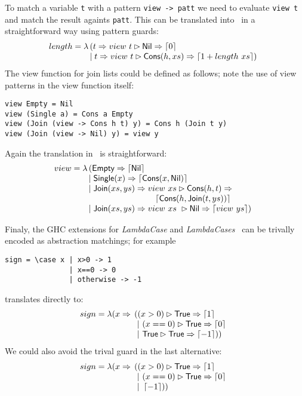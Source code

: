 To match a variable \texttt{t} with a pattern \verb|view -> patt|
we need to evaluate \verb|view t| and match the result againts \verb|patt|.
This can be translated into \lambdaPMC\ in a straightforward way
using pattern guards:
\[
  length = \lambda \!\!\begin{array}[t]{l}
                     (t \Rightarrow view~t \rhd 
      \textsf{Nil} \Rightarrow \left\lceil 0\right\rceil \\
      \mid t \Rightarrow view~t \rhd \textsf{Cons}(h,xs) \Rightarrow \left\lceil 1+length~ xs\right\rceil)
    \end{array} \\
\]
The view function for join lists could be defined as follows; note the use
of view patterns in the view function itself:
\begin{verbatim}
view Empty = Nil
view (Single a) = Cons a Empty
view (Join (view -> Cons h t) y) = Cons h (Join t y)
view (Join (view -> Nil) y) = view y
\end{verbatim}
Again the translation in \lambdaPMC\ is straightforward:
\[
  view = \lambda\!\!
  \begin{array}[t]{l}
    (\textsf{Empty} \Rightarrow \left\lceil \textsf{Nil}\right\rceil \\
    \mid \textsf{Single}(x) \Rightarrow \left\lceil \textsf{Cons}(x,\textsf{Nil})\right\rceil \\
    \mid \textsf{Join}(xs,ys) \Rightarrow view~xs \rhd 
    \textsf{Cons}(h,t) \Rightarrow \\
    \qquad \qquad\qquad\qquad \left\lceil \textsf{Cons}(h,\textsf{Join}(t,ys))\right\rceil \\
    \mid \textsf{Join}(xs,ys) \Rightarrow view~xs ~ \rhd
    \textsf{Nil} \Rightarrow \left\lceil view~ys\right\rceil)
  \end{array}
\]

Finaly, the GHC extensions for \emph{LambdaCase} and
\emph{LambdaCases}~\cite{ghc_guide_lambda_case} can be trivally
encoded as abstraction matchings; for example
\begin{verbatim}
sign = \case x | x>0 -> 1
               | x==0 -> 0
               | otherwise -> -1
\end{verbatim}
translates directly to:
\[ sign = \lambda (x \Rightarrow \!\!\begin{array}[t]{l}
  ((x>0) \rhd  \textsf{True} \Rightarrow \left\lceil 1\right\rceil \\
  ~|~ (x==0)\rhd \textsf{True} \Rightarrow \left\lceil 0\right\rceil\\
  ~|~ \textsf{True} \rhd \textsf{True} \Rightarrow  \left\lceil -1\right\rceil ))
 \end{array}    
\]
%
We could also avoid the trival guard in the last alternative:
%
\[ sign = \lambda (x \Rightarrow \!\!\begin{array}[t]{l}
  ((x>0) \rhd  \textsf{True} \Rightarrow \left\lceil 1\right\rceil \\
  ~|~ (x==0)\rhd \textsf{True} \Rightarrow \left\lceil 0\right\rceil\\
  ~|~  \left\lceil -1\right\rceil ))
 \end{array}    
\]
  

